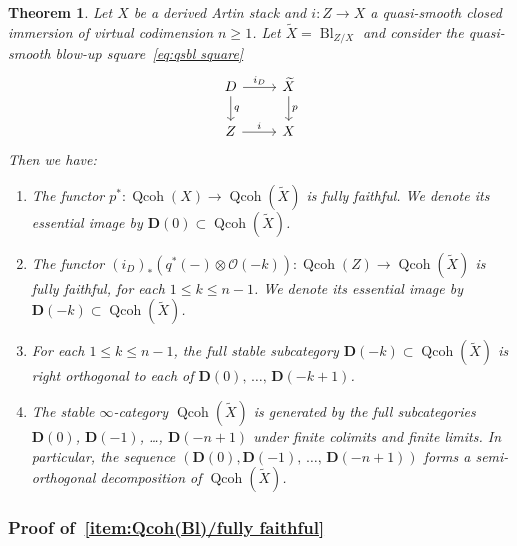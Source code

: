 \documentclass[11pt]{article}
\newtheorem{theo}{Theorem}[section]
\theoremstyle{definition}
\numberwithin{equation}{section}
\numberwithin{figure}{section}
\numberwithin{table}{section}
\newcommand{\sO}{\ensuremath{\mathcal{O}}\xspace}
\newcommand{\bD}{\ensuremath{\mathbf{D}}\xspace}
\renewcommand{\ge}{\geqslant}
\renewcommand{\le}{\leqslant}
\DeclareMathOperator{\Qcoh}{Qcoh}
\DeclareMathOperator{\Bl}{Bl}
\newcommand*{\romanenumi}{\renewcommand*{\theenumi}{\roman{enumi}}}
\begin{document}
\begin{theo}\label{thm:Qcoh(Bl)}
Let $X$ be a derived Artin stack and $i : Z \to X$ a quasi-smooth closed immersion of virtual codimension $n\ge 1$. Let $\widetilde{X} = \Bl_{Z/X}$ and consider the quasi-smooth blow-up square~\eqref{eq:qsbl square}
\[
\begin{tikzcd}
D \ar{r}{i_D}\ar{d}{q} & \widetilde{X} \ar{d}{p}
\\
Z \ar{r}{i} & X
\end{tikzcd}
\]
Then we have:
\begin{enumerate}\romanenumi
\item \label{item:Qcoh(Bl)/fully faithful}
The functor $p^* : \Qcoh(X) \to \Qcoh(\widetilde{X})$ is fully faithful. We denote its essential image by $\bD(0) \subset \Qcoh(\widetilde{X})$.

\item \label{item:Qcoh(Bl)/fully faithful 2}
The functor $(i_D)_*(q^*(-) \otimes \sO(-k)) : \Qcoh(Z) \to \Qcoh(\widetilde{X})$ is fully faithful, for each $1\le k\le n-1$. We denote its essential image by $\bD(-k) \subset \Qcoh(\widetilde{X})$.

\item \label{item:Qcoh(Bl)/orthogonal}
For each $1\le k\le n-1$, the full stable subcategory $\bD(-k) \subset \Qcoh(\widetilde{X})$ is right orthogonal to each of $\bD(0),\,\ldots,\,\bD(-k+1)$.

\item \label{item:Qcoh(Bl)/generates}
The stable $\infty$-category $\Qcoh(\widetilde{X})$ is generated by the full subcategories $\bD(0)$, $\bD(-1)$, \ldots, $\bD(-n+1)$ under finite colimits and finite limits. In particular, the sequence $(\bD(0), \bD(-1),\,\ldots,\,\bD(-n+1))$ forms a semi-orthogonal decomposition of $\Qcoh(\widetilde{X})$.
\end{enumerate}
\end{theo}

\subsubsection{Proof of~\eqref{item:Qcoh(Bl)/fully faithful}}
\end{document}
